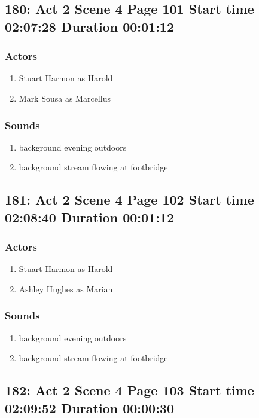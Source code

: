 \subsection{180: Act 2 Scene 4 Page 101 Start time 02:07:28 Duration 00:01:12}

\subsubsection{Actors}
\begin{enumerate}
\item Stuart Harmon as Harold
\item Mark Sousa as Marcellus
\end{enumerate}

\subsubsection{Sounds}
\begin{enumerate}
\item background evening outdoors
\item background stream flowing at footbridge
\end{enumerate}
\subsection{181: Act 2 Scene 4 Page 102 Start time 02:08:40 Duration 00:01:12}

\subsubsection{Actors}
\begin{enumerate}
\item Stuart Harmon as Harold
\item Ashley Hughes as Marian
\end{enumerate}

\subsubsection{Sounds}
\begin{enumerate}
\item background evening outdoors
\item background stream flowing at footbridge
\end{enumerate}
\subsection{182: Act 2 Scene 4 Page 103 Start time 02:09:52 Duration 00:00:30}

